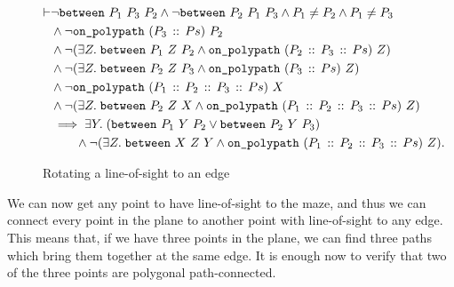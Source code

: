 \begin{figure}
\begin{equation}\label{eq:RotateToEdge}
  \begin{split}
\vdash&\neg\texttt{between}\ P_1\ P_3\ P_2 \wedge \neg\texttt{between}\ P_2\ P_1\ P_3 \wedge P_1 \neq P_2 \wedge P_1 \neq P_3\\
    &\wedge\neg\texttt{on\_polypath}\ (P_3\,::\,Ps)\ P_2\\
    &\wedge\neg(\exists Z.\; \texttt{between}\ P_1\ Z\ P_2 \wedge \texttt{on\_polypath}\ (P_2\,::\,P_3\,::\,Ps)\ Z)\\
    &\wedge\neg(\exists Z.\; \texttt{between}\ P_2\ Z\ P_3 \wedge \texttt{on\_polypath}\ (P_3\,::\,Ps)\ Z)\\
    &\wedge\neg\texttt{on\_polypath}\ (P_1\,::\,P_2\,::\,P_3\,::\,Ps)\ X\\
    &\wedge\neg(\exists Z.\; \texttt{between}\ P_2\ Z\ X \wedge \texttt{on\_polypath}\ (P_1\,::\,P_2\,::\,P_3\,::\,Ps)\ Z)\\
    &\implies\exists Y.\; (\texttt{between}\ P_1\ Y\ P_2 \vee \texttt{between}\ P_2\ Y\ P_3)\\
    &\qquad \wedge \neg(\exists Z.\; \texttt{between}\ X\ Z\ Y \wedge \texttt{on\_polypath}\ (P_1\,::\,P_2\,::\,P_3\,::\,Ps)\ Z).
  \end{split}
\end{equation}
\caption{Rotating a line-of-sight to an edge}
\label{fig:RotateToEdge}
\end{figure}

We can now get any point to have line-of-sight to the maze, and thus we can connect every point in the plane to another point with line-of-sight to any edge. This means that, if we have three points in the plane, we can find three paths which bring them together at the same edge. It is enough now to verify that two of the three points are polygonal path-connected.

